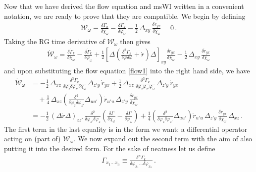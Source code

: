\documentclass[11pt]{book} %
\numberwithin{equation}{chapter}
\begin{document}
Now that we have derived the flow equation and msWI written in a convenient notation,
we are ready to prove that they are compatible. We begin by defining
\begin{align}
	\mathcal{W}_\omega\equiv\frac{\delta \Gamma_k}{\delta\chi_\omega}-\frac{\delta \Gamma_k}{\delta\varphi_\omega}
	- \frac{1}{2} \, \Delta_{xy} \, \frac{\delta r_{yx}}{\delta\chi_\omega} =0 \,.
\label{cal-W}
\end{align}
Taking the RG time derivative of $\mathcal{W_\omega}$ then gives
\begin{align}
	\mathcal{\dot W}_\omega= \frac{\delta \dot\Gamma_k}{\delta\chi_\omega}
	-\frac{\delta \dot\Gamma_k}{\delta\varphi_\omega}+
	\frac{1}{2}\left[\Delta\left(\frac{\delta^{2}\dot{\Gamma}_k}{\delta\varphi \delta\varphi}
	+\dot r\right)\Delta\right]_{\!xy}\frac{\delta r_{yx}}{\delta\chi_\omega}
	-\frac{1}{2} \, \Delta_{xy} \, \frac{\delta \dot r_{yx}}{\delta\chi_\omega}
	\label{WIdot}
\end{align}
and upon substituting the flow equation \eqref{flow1} into the right hand side, we have
\begin{align}
  \label{WIdot-2}
	\mathcal{\dot W}_{\omega} &= -\frac{1}{2} \, \Delta_{xz} \,
	\frac{\delta^{3}\Gamma_k}{\delta\varphi_{z}\delta\varphi_{z'}\delta\chi_{\omega}}
  \, \Delta_{z'y} \, \dot r_{yx}
	 + \frac{1}{2} \, \Delta_{xz} \, \frac{\delta^{3}\Gamma_k}{\delta\varphi_{z} \varphi_{z'}\varphi_\omega} \,
   \Delta_{z'y} \, \dot{r}_{yx}
	 \nonumber\\ &\quad
	 + \frac{1}{4} \, \Delta_{xz}
   \left(
     \frac{\delta^{2}}{\delta\varphi_{z}\delta\varphi_{z'}}\Delta_{uu'}
   \right)
	 \dot r_{u'u} \, \Delta_{z'y} \, \frac{\delta r_{yx}}{\delta\chi_{\omega}} \nonumber \\
	&= -\frac{1}{2} \, (\Delta \dot{r} \Delta)_{zz'} \, \frac{\delta^{2}}{\delta\varphi_{z'}\delta\varphi_{z}}
	 \left(\frac{\delta\Gamma}{\delta\chi_\omega}-\frac{\delta\Gamma}{\delta\varphi_\omega}\right)
	  +\frac{1}{4}\left(\frac{\delta^{2}}{\delta\varphi_{z}\delta\varphi_{z'}}\Delta_{uu'}\right)
	 \dot r_{u'u} \, \Delta_{z'y} \, \frac{\delta r_{yx}}{\delta\chi_{\omega}} \, \Delta_{xz} \,.
\end{align}
The first term in the last equality is in the form we want: a differential operator acting on (part of)
$\mathcal{W_\omega}$. We now expand out the second term with the aim of also putting it into the desired form.
For the sake of neatness let us define
\begin{align}
		\Gamma_{x_1...x_n}\equiv \frac{\delta^n\Gamma_k}{\delta\varphi_{x_1}...\delta\varphi_{x_n}} \,.
\end{align}
\end{document}
